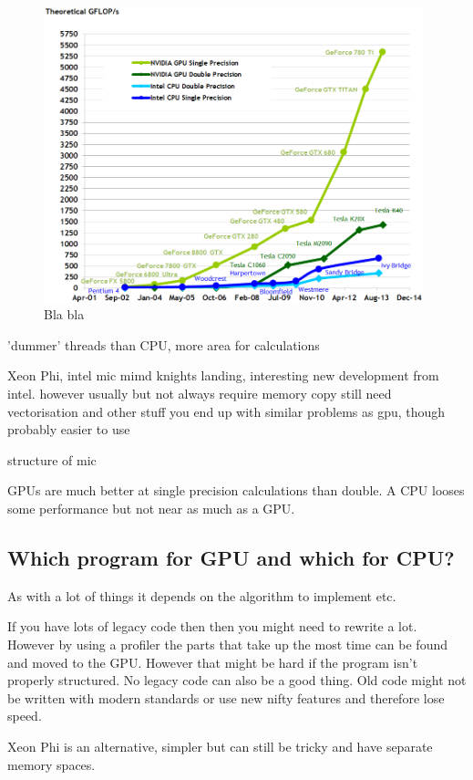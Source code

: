 \documentclass[10pt,a4paper]{report}
\begin{document}
\begin{figure}[h]
    \centering
    \includegraphics[width=11cm]{floating-point-operations-per-second.png}
    \caption{Bla bla \cite{cuda}}
    \label{fig:gpu_vs_cpu}
\end{figure}


'dummer' threads than CPU, more area for calculations

Xeon Phi, intel mic
mimd
knights landing, interesting new development from intel.
however usually but not always require memory copy
still need vectorisation and other stuff
you end up with similar problems as gpu, though probably easier to use

structure of mic

GPUs are much better at single precision calculations than double. A CPU looses some performance but not near as much as a GPU.\cite{cuda, nvtesla}

\subsection{Which program for GPU and which for CPU?}
\label{gpu_gwas}
As with a lot of things it depends on the algorithm to implement etc.

If you have lots of legacy code then then you might need to rewrite a lot. However by using a profiler the parts that take up the most time can be found and moved to the GPU. However that might be hard if the program isn't properly structured. No legacy code can also be a good thing. Old code might not be written with modern standards or use new nifty features and therefore lose speed.

Xeon Phi is an alternative, simpler but can still be tricky and have separate memory spaces.
\end{document}

